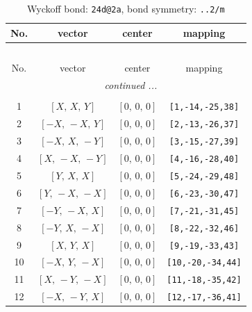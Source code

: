 \documentclass[fleqn,8pt]{jsarticle}
\begin{document}
\begin{longtable}{cccc}
\caption{Wyckoff bond: {\tt 24d@2a}, bond symmetry: {\tt ..2/m}}
 \\
 \hline \hline
No. & vector & center & mapping \\ \hline \endfirsthead

\multicolumn{3}{l}{\tablename\ \thetable{}} \\
 \hline \hline
No. & vector & center & mapping \\ \hline \endhead

 \hline \hline
\multicolumn{3}{r}{\footnotesize\it continued ...} \\ \endfoot

 \hline \hline
\multicolumn{3}{r}{} \\ \endlastfoot

1 & $\left[ X,\, X,\, Y \right]$ & $\left[ 0,\, 0,\, 0 \right]$ & {\tt [1,-14,-25,38]} \\ \hline
2 & $\left[ - X,\, - X,\, Y \right]$ & $\left[ 0,\, 0,\, 0 \right]$ & {\tt [2,-13,-26,37]} \\ \hline
3 & $\left[ - X,\, X,\, - Y \right]$ & $\left[ 0,\, 0,\, 0 \right]$ & {\tt [3,-15,-27,39]} \\ \hline
4 & $\left[ X,\, - X,\, - Y \right]$ & $\left[ 0,\, 0,\, 0 \right]$ & {\tt [4,-16,-28,40]} \\ \hline
5 & $\left[ Y,\, X,\, X \right]$ & $\left[ 0,\, 0,\, 0 \right]$ & {\tt [5,-24,-29,48]} \\ \hline
6 & $\left[ Y,\, - X,\, - X \right]$ & $\left[ 0,\, 0,\, 0 \right]$ & {\tt [6,-23,-30,47]} \\ \hline
7 & $\left[ - Y,\, - X,\, X \right]$ & $\left[ 0,\, 0,\, 0 \right]$ & {\tt [7,-21,-31,45]} \\ \hline
8 & $\left[ - Y,\, X,\, - X \right]$ & $\left[ 0,\, 0,\, 0 \right]$ & {\tt [8,-22,-32,46]} \\ \hline
9 & $\left[ X,\, Y,\, X \right]$ & $\left[ 0,\, 0,\, 0 \right]$ & {\tt [9,-19,-33,43]} \\ \hline
10 & $\left[ - X,\, Y,\, - X \right]$ & $\left[ 0,\, 0,\, 0 \right]$ & {\tt [10,-20,-34,44]} \\ \hline
11 & $\left[ X,\, - Y,\, - X \right]$ & $\left[ 0,\, 0,\, 0 \right]$ & {\tt [11,-18,-35,42]} \\ \hline
12 & $\left[ - X,\, - Y,\, X \right]$ & $\left[ 0,\, 0,\, 0 \right]$ & {\tt [12,-17,-36,41]} \\
\end{longtable}
\renewcommand{\arraystretch}{1.2}
\end{document}
